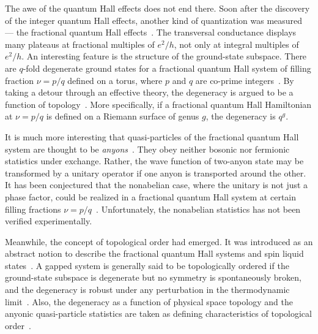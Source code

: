The awe of the quantum Hall effects does not end there. Soon after the discovery of the integer quantum Hall effects, another kind of quantization was measured --- the fractional quantum Hall effects~\cite{TsuiStoermerGossard1982FQHE,Laughlin1983FQHE}. The transversal conductance displays many plateaus at fractional multiples of $e^2/h$, not only at integral multiples of $e^2/h$.
An interesting feature is the structure of the ground-state subspace. There are $q$-fold degenerate ground states for a fractional quantum Hall system of filling fraction $\nu = p/q$ defined on a torus, where $p$ and $q$ are co-prime integers~\cite{NiuThoulessWu1985Topological,Haldane1985MagneticTranslation}. By taking a detour through an effective theory, the degeneracy is argued to be a function of topology~\cite{WenNiu1990GroundState}. More specifically, if a fractional quantum Hall Hamiltonian at $\nu = p/q$ is defined on a Riemann surface of genus $g$, the degeneracy is $q^g$.

It is much more interesting that quasi-particles of the fractional quantum Hall system are thought to be {\em anyons}~\cite{Wilczek1982Anyon}. They obey neither bosonic nor fermionic statistics under exchange. Rather, the wave function of two-anyon state may be transformed by a unitary operator if one anyon is transported around the other. It has been conjectured that the nonabelian case, where the unitary is not just a phase factor, could be realized in a fractional quantum Hall system at certain filling fractions $\nu = p/q$~\cite{WillettEtAl1987EvenFQHE,MooreRead1991Nonabelions}. Unfortunately, the nonabelian statistics has not been verified experimentally.

Meanwhile, the concept of topological order had emerged. It was introduced as an abstract notion to describe the fractional quantum Hall systems and spin liquid states~\cite{WenWilczekZee1989Chiral}. A gapped system is generally said to be topologically ordered if the ground-state subspace is degenerate but no symmetry is spontaneously broken, and the degeneracy is robust under any perturbation in the thermodynamic limit~\cite{Wen1991SpinLiquid,ReadSachdev1991LargeN}. Also, the degeneracy as a function of physical space topology and the anyonic quasi-particle statistics are taken as defining characteristics of topological order~\cite{WenNiu1990GroundState,Kitaev2003Fault-tolerant,MooreRead1991Nonabelions}.

